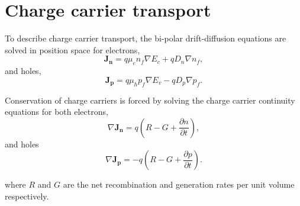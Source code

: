 \section{Charge carrier transport}
To describe charge carrier transport, the bi-polar drift-diffusion equations are solved in position space
for electrons,
\begin{equation}
\label{eq:ndrive}
\boldsymbol{J_n} = q \mu_e n_{f}  {\nabla E_{c}}  + q D_n  {\nabla n_{f}},
\end{equation}
and holes,
\begin{equation}
\label{eq:pdrive}
\boldsymbol{J_p} = q \mu_h p_{f}  {\nabla E_{v}}  - q D_p {\nabla p_{f}}.
\end{equation}

Conservation of charge carriers is forced by solving the charge carrier continuity equations for both electrons,
\begin{equation}
\label{eq:contn}
\nabla \boldsymbol{J_n}  = q (R-G+\frac{\partial n}{\partial t}),
\end{equation}
and holes
\begin{equation}
\label{eq:contp}
\nabla \boldsymbol{J_p} = - q (R-G+\frac{\partial p}{\partial t}).
\end{equation}

where $R$ and $G$ are the net recombination and generation rates per unit volume respectively.
